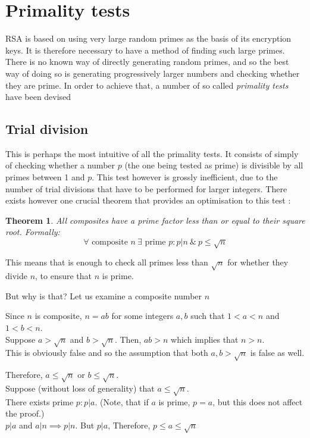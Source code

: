 \documentclass[12pt, titlepage]{article}
\newtheorem{theorem}{Theorem}
\begin{document}
\section{Primality tests}
RSA is based on using very large random primes as the basis of its encryption keys. It is
therefore necessary to have a method of finding such large primes. There is no known way of
directly generating random primes, and so the best way of doing so is generating
progressively larger numbers and checking whether they are prime. In order to achieve that,
a number of so called \emph{primality tests} have been devised

    \subsection{Trial division}

    This is perhaps the most intuitive of all the primality tests. It consists of simply of
    checking whether a number $p$ (the one being tested as prime) is divisible by all primes
    between 1 and $p$. This test however is grossly inefficient, due to the number of trial
    divisions that have to be performed for larger integers. There exists however one
    crucial theorem that provides an optimisation to this test
    \autocite[276]{haese_ib_options}:
    \begin{theorem} \label{th:prime_factors_less_than_root}
        All composites have a prime factor less than or equal to their square
        root. Formally:\\
        $$\forall \text{ composite } n \: \exists \text{ prime } p:p|n \: \& \: p \leq \sqrt{n}$$
    \end{theorem}
    This means that is enough to check all primes less than $\sqrt{n}$ for whether they
    divide $n$, to ensure that $n$ is prime. 
    
    But why is that? Let us examine a composite number $n$

    Since $n$ is composite, $n=ab$ for some integers $a, b$ such that $1<a<n$ and $1<b<n$.\\
    Suppose $a>\sqrt{n}$ and $b>\sqrt{n}$. Then, $ab>n$ which implies that $n>n$. \\
    This is obviously false and so the assumption that both $a,b > \sqrt{n}$ is false as
    well.

    Therefore, $a \leq \sqrt{n}$ or $b \leq \sqrt{n}$. \\
    Suppose (without loss of generality) that $a \leq \sqrt{n}$.\\
    There exists prime $p: p|a$. (Note, that if $a$ is prime, $p = a$, but this does not
    affect the proof.)\\
    $p|a$ and $a|n \implies p|n$. But $p|a$, Therefore,  $p \leq a \leq \sqrt{n}$\\
\end{document}
